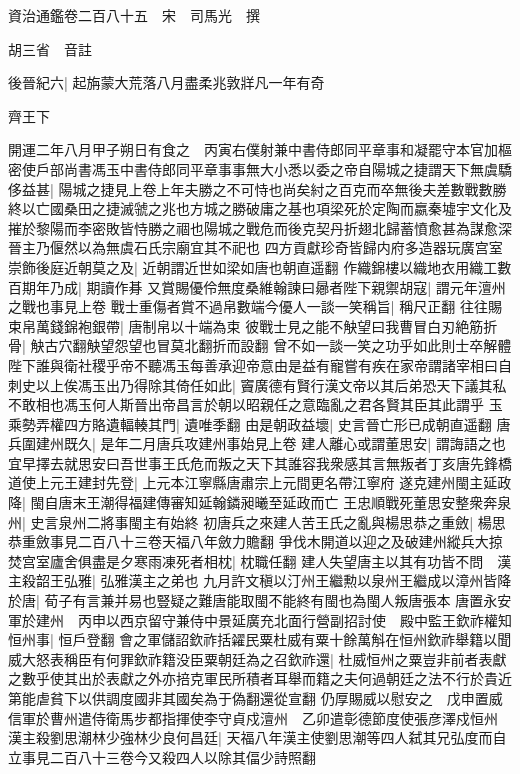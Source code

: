 資治通鑑卷二百八十五　宋　司馬光　撰

胡三省　音註

後晉紀六|{
	起旃蒙大荒落八月盡柔兆敦牂凡一年有奇}


齊王下

開運二年八月甲子朔日有食之　丙寅右僕射兼中書侍郎同平章事和凝罷守本官加樞密使戶部尚書馮玉中書侍郎同平章事事無大小悉以委之帝自陽城之捷謂天下無虞驕侈益甚|{
	陽城之捷見上卷上年夫勝之不可恃也尚矣紂之百克而卒無後夫差數戰數勝終以亡國桑田之捷滅虢之兆也方城之勝破庸之基也項梁死於定陶而嬴秦墟宇文化及摧於黎陽而李密敗皆恃勝之祻也陽城之戰危而後克契丹折翅北歸蓄憤愈甚為謀愈深晉主乃偃然以為無虞石氏宗廟宜其不祀也}
四方貢獻珍奇皆歸内府多造器玩廣宫室崇飾後庭近朝莫之及|{
	近朝謂近世如梁如唐也朝直遥翻}
作織錦樓以織地衣用織工數百期年乃成|{
	期讀作朞}
又賞賜優伶無度桑維翰諫曰曏者陛下親禦胡寇|{
	謂元年澶州之戰也事見上卷}
戰士重傷者賞不過帛數端今優人一談一笑稱旨|{
	稱尺正翻}
往往賜束帛萬錢錦袍銀帶|{
	唐制帛以十端為束}
彼戰士見之能不觖望曰我曹冒白刃絶筋折骨|{
	觖古穴翻觖望怨望也冒莫北翻折而設翻}
曾不如一談一笑之功乎如此則士卒解體陛下誰與衛社稷乎帝不聽馮玉每善承迎帝意由是益有寵嘗有疾在家帝謂諸宰相曰自刺史以上俟馮玉出乃得除其倚任如此|{
	竇廣德有賢行漢文帝以其后弟恐天下議其私不敢相也馮玉何人斯晉出帝昌言於朝以昭親任之意臨亂之君各賢其臣其此謂乎}
玉乘勢弄權四方賂遺輻輳其門|{
	遺唯季翻}
由是朝政益壞|{
	史言晉亡形已成朝直遥翻}
唐兵圍建州既久|{
	是年二月唐兵攻建州事始見上卷}
建人離心或謂董思安|{
	謂誨語之也}
宜早擇去就思安曰吾世事王氏危而叛之天下其誰容我衆感其言無叛者丁亥唐先鋒橋道使上元王建封先登|{
	上元本江寧縣唐肅宗上元間更名帶江寧府}
遂克建州閩主延政降|{
	閩自唐末王潮得福建傳審知延翰鏻昶曦至延政而亡}
王忠順戰死董思安整衆奔泉州|{
	史言泉州二將事閩主有始終}
初唐兵之來建人苦王氏之亂與楊思恭之重斂|{
	楊思恭重斂事見二百八十三卷天福八年斂力贍翻}
爭伐木開道以迎之及破建州縱兵大掠焚宫室廬舍俱盡是夕寒雨凍死者相枕|{
	枕職任翻}
建人失望唐主以其有功皆不問　漢主殺韶王弘雅|{
	弘雅漢主之弟也}
九月許文稹以汀州王繼勲以泉州王繼成以漳州皆降於唐|{
	荀子有言兼并易也豎疑之難唐能取閩不能終有閩也為閩人叛唐張本}
唐置永安軍於建州　丙申以西京留守兼侍中景延廣充北面行營副招討使　殿中監王欽祚權知恒州事|{
	恒戶登翻}
會之軍儲詔欽祚括糴民粟杜威有粟十餘萬斛在恒州欽祚舉籍以聞威大怒表稱臣有何罪欽祚籍没臣粟朝廷為之召欽祚還|{
	杜威恒州之粟豈非前者表獻之數乎使其出於表獻之外亦掊克軍民所積者耳舉而籍之夫何過朝廷之法不行於貴近第能虐貧下以供調度國非其國矣為于偽翻還從宣翻}
仍厚賜威以慰安之　戊申置威信軍於曹州遣侍衛馬步都指揮使李守貞戍澶州　乙卯遣彰德節度使張彦澤戍恒州　漢主殺劉思潮林少強林少良何昌廷|{
	天福八年漢主使劉思潮等四人弑其兄弘度而自立事見二百八十三卷今又殺四人以除其偪少詩照翻}
